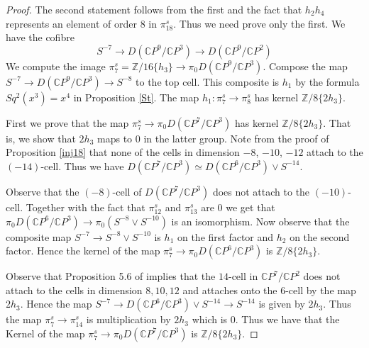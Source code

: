 \documentclass[a4paper,leqno,12pt]{amsart}
\theoremstyle{plain}
\theoremstyle{definition}
\numberwithin{equation}{section}
\begin{document}
\begin{proof}
The second statement follows from the first and the fact that $h_2h_4$ represents an element of order $8$ in $\pi_{18}^s$. Thus we need prove only the first. We have the cofibre 
$$S^{-7} \to D({\mathbb{C}} P^9/ {\mathbb{C}} P^3) \to D({\mathbb{C}} P^9/{\mathbb{C}} P^2)  $$
We compute the image $\pi_7^s = {\mathbb{Z}}/16\{h_3\} \to \pi_0 D({\mathbb{C}} P^9/ {\mathbb{C}} P^3)$. Compose the map $S^{-7} \to D({\mathbb{C}} P^9/{\mathbb{C}} P^3) \to S^{-8}$ to the top cell. This composite is $h_1$ by the formula  $Sq^2(x^3)=x^4$ in Proposition \ref{St}. The map $h_1 : \pi_7^s \to \pi_8^s$ has kernel ${\mathbb{Z}}/8\{2h_3\}$. 

First we prove that the map $\pi_7^s \to \pi_0D({\mathbb{C}} P^7/{\mathbb{C}} P^3)$ has kernel ${\mathbb{Z}}/8\{2h_3\}$. That is, we show that $2h_3$ maps to $0$ in the latter group. Note from the proof of Proposition \ref{inj18} that none of the cells in dimension $-8$, $-10$, $-12$ attach to the $(-14)$-cell. Thus we have $D({\mathbb{C}} P^7/ {\mathbb{C}} P^3) \simeq D({\mathbb{C}} P^6/{\mathbb{C}} P^3) \vee S^{-14}$. 

Observe that the $(-8)$-cell of $D({\mathbb{C}} P^7/ {\mathbb{C}} P^3)$ does not attach to the $(-10)$-cell. Together with the fact that $\pi_{12}^s$ and $\pi_{13}^s$ are $0$ we get that $\pi_0D({\mathbb{C}} P^6/{\mathbb{C}} P^3)\to \pi_0(S^{-8}\vee S^{-10})$  is an isomorphism. Now observe that  the composite map $S^{-7}\to S^{-8}\vee S^{-10}$ is $h_1$ on the first factor and $h_2$ on the second factor. Hence the kernel of the map $\pi_7^s \to \pi_0D({\mathbb{C}} P^6/{\mathbb{C}} P^3)$ is ${\mathbb{Z}}/8\{2h_3\}$. 

Observe that Proposition 5.6 of \cite{Mos68} implies that the $14$-cell in ${\mathbb{C}} P^7/{\mathbb{C}} P^2$ does not attach to the cells in dimension $8,10,12$ and attaches onto the $6$-cell by the map $2h_3$. Hence the map $S^{-7} \to D({\mathbb{C}} P^6/{\mathbb{C}} P^3)\vee S^{-14} \to S^{-14}$ is given by $2h_3$. Thus the map $\pi_7^s \to \pi_{14}^s$ is multiplication by $2h_3$ which is $0$. Thus we have that the Kernel of the map $\pi_7^s \to \pi_0D({\mathbb{C}} P^7/{\mathbb{C}} P^3)$ is ${\mathbb{Z}}/8\{2h_3\}$.


\end{proof}
\end{document}
